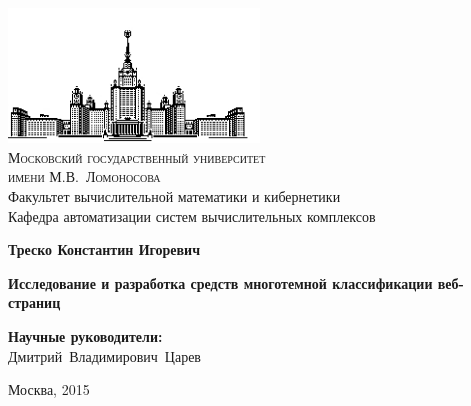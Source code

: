 \documentclass[russian, utf8, emptystyle]{eskdtext}
\begin{document}
\thispagestyle{empty}

\begin{center}
	\ \vspace{-2cm}
	
	\includegraphics[width=0.5\textwidth]{msu.jpg}\\
	{\scshape Московский государственный университет \\ имени М.В.~Ломоносова}\\
	Факультет вычислительной математики и кибернетики\\
	Кафедра  автоматизации систем вычислительных комплексов
	
	\vspace{4cm}
	
	\textbf{{\Large Треско Константин Игоревич}}
	
	\vspace{1cm}
	
	{\Huge\bfseries
	Исследование и разработка средств многотемной классификации веб-страниц\\}
\end{center}

\vspace{1cm}


\vspace{2cm}

\vfill

\begin{flushright}
	\normalsize
	\textbf{Научные руководители:}\\
	Дмитрий~Владимирович~Царев
\end{flushright}

\vfill

\begin{center}
	Москва, 2015
\end{center}

\enlargethispage{4\baselineskip}
\end{document}
